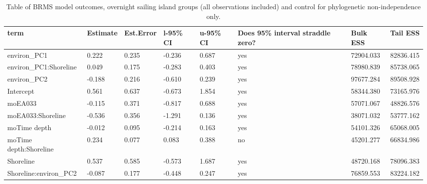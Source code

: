 \begin{table}[ht]
\centering
\begin{tabular}{p{5cm}p{2cm}p{2cm}p{2cm}p{2cm}p{2cm}p{2cm}p{2cm}}
  \toprule
term & Estimate & Est.Error & l-95\% CI & u-95\% CI & Does 95\% interval straddle zero? & Bulk ESS & Tail ESS \\ 
  \midrule
environ\_PC1 & 0.222 & 0.235 & -0.236 & 0.687 & yes & 72904.033 & 82836.415 \\ 
  environ\_PC1:Shoreline & 0.049 & 0.175 & -0.283 & 0.403 & yes & 78980.839 & 85738.065 \\ 
  environ\_PC2 & -0.188 & 0.216 & -0.610 & 0.239 & yes & 97677.284 & 89508.928 \\ 
  Intercept & 0.561 & 0.637 & -0.673 & 1.854 & yes & 58344.380 & 73165.976 \\ 
  moEA033 & -0.115 & 0.371 & -0.817 & 0.688 & yes & 57071.067 & 48826.576 \\ 
  moEA033:Shoreline & -0.536 & 0.356 & -1.291 & 0.136 & yes & 38071.032 & 53777.162 \\ 
  moTime depth & -0.012 & 0.095 & -0.214 & 0.163 & yes & 54101.326 & 65068.005 \\ 
  moTime depth:Shoreline & 0.234 & 0.077 & 0.083 & 0.388 & no & 45201.277 & 66834.986 \\ 
  Shoreline & 0.537 & 0.585 & -0.573 & 1.687 & yes & 48720.168 & 78096.383 \\ 
  Shoreline:environ\_PC2 & -0.087 & 0.177 & -0.448 & 0.247 & yes & 76859.553 & 83224.182 \\ 
   \bottomrule
\end{tabular}
\caption{Table of BRMS model outcomes, overnight sailing island groups (all observations included) and control for phylogenetic non-independence only.} 
\label{BRMS_effects_SBZR_control_none}
\end{table}

